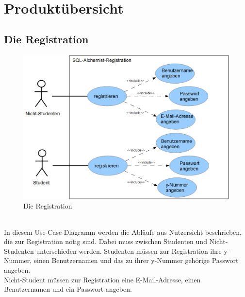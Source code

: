 
\chapter{Produktübersicht}



\section{Die Registration}


\begin{figure}[ht]
\centering
\includegraphics[width=1.0\textwidth]{figures/Registration.PNG}
\caption{Die Registration}
\end{figure}\\
In diesem Use-Case-Diagramm werden die Abl\"aufe aus Nutzersicht beschrieben, die zur Registration nötig sind. Dabei muss zwischen Studenten und Nicht-Studenten unterschieden werden.
Studenten müssen zur Registration ihre y-Nummer, einen Benutzernamen und das zu ihrer y-Nummer gehörige Passwort angeben.\\
Nicht-Student müssen zur Registration eine E-Mail-Adresse, einen Benutzernamen und ein Passwort angeben.\\\\\\\\\\




